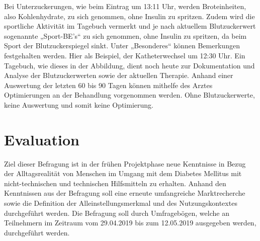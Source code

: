 \documentclass[a4paper,11pt]{article}%
\renewcommand{\\}{\vspace*{0.5\baselineskip} \newline}
\begin{document}
	Bei Unterzuckerungen, wie beim Eintrag um 13:11 Uhr, werden Broteinheiten, also Kohlenhydrate, zu sich genommen, ohne Insulin zu spritzen.\newline
	Zudem wird die sportliche Aktivität im Tagebuch vermerkt und je nach aktuellem Blutzuckerwert sogenannte „Sport-BE’s“ zu sich genommen, ohne Insulin zu spritzen, da beim Sport der Blutzuckerspiegel sinkt.\newline
	Unter „Besonderes“ können Bemerkungen festgehalten werden. Hier als Beispiel, der Katheterwechsel um 12:30 Uhr.\newline
	Ein Tagebuch, wie dieses in der Abbildung, dient noch heute zur Dokumentation und Analyse der Blutzuckerwerten sowie der aktuellen Therapie. Anhand einer Auswertung der letzten 60 bis 90 Tagen können mithelfe des Arztes Optimierungen an der Behandlung vorgenommen werden. Ohne Blutzuckerwerte, keine Auswertung und somit keine Optimierung.
	\newpage
	\section{Evaluation}
	\label{section:Evaluation}
	Ziel dieser Befragung ist in der frühen Projektphase neue Kenntnisse in Bezug der Alltagsrealität von Menschen im Umgang mit dem Diabetes Mellitus mit nicht-technischen und technischen Hilfsmitteln zu erhalten.\newline
	Anhand den Kenntnissen aus der Befragung soll eine erneute umfangreiche Marktrecherche sowie die Definition der Alleinstellungsmerkmal und des Nutzungskontextes durchgeführt werden. Die Befragung soll durch Umfragebögen, welche an Teilnehmern im Zeitraum vom 29.04.2019 bis zum 12.05.2019 ausgegeben werden, durchgeführt werden. 
\end{document}
